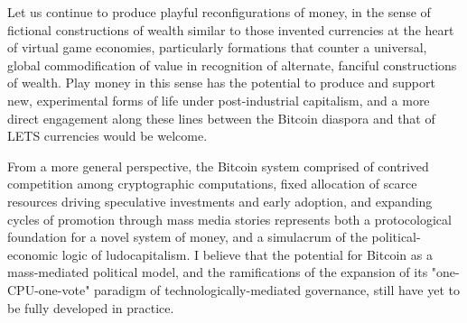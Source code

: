 Let us continue to produce playful reconfigurations of money, in the sense of fictional constructions of wealth similar to those invented currencies at the heart of virtual game economies, particularly formations that counter a universal, global commodification of value in recognition of alternate, fanciful constructions of wealth. Play money in this sense has the potential to produce and support new, experimental forms of life under post-industrial capitalism, and a more direct engagement along these lines between the Bitcoin diaspora and that of LETS currencies would be welcome.

From a more general perspective, the Bitcoin system comprised of contrived competition among cryptographic computations, fixed allocation of scarce resources driving speculative investments and early adoption, and expanding cycles of promotion through mass media stories represents both a protocological foundation for a novel system of money, and a simulacrum of the political-economic logic of ludocapitalism. I believe that the potential for Bitcoin as a mass-mediated political model, and the ramifications of the expansion of its "one-CPU-one-vote" paradigm of technologically-mediated governance, still have yet to be fully developed in practice.
